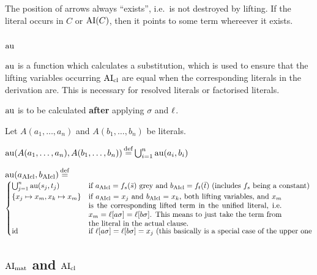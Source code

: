 \documentclass[,%
	paper=a4,%
	DIV12, %
	twoside=false,%
	liststotoc,
	bibtotoc,
	draft=false,%
	numbers=noendperiod
]{scrartcl}
\begin{document}
\begin{conj}
	The position of arrows always ``exists'', i.e.~is not destroyed by lifting. If the literal occurs in $C$ or $\operatorname{AI}(C)$, then it points to some term whereever it exists.
\end{conj}

\subsection{$\operatorname{au}$}

$\operatorname{au}$ is a function which calculates a substitution, which is used to ensure that the lifting variables occurring $\operatorname{AI}_\mathrm{cl}$ are equal when the corresponding literals in the derivation are. This is necessary for resolved literals or factorised literals.

$\operatorname{au}$ is to be calculated \textbf{after} applying $\sigma$ and $\ell$.

Let $A(a_1, \dotsc, a_n)$ and $A(b_1, \dotsc, b_n)$ be literals.

$\operatorname{au}(A(a_1, \dotsc, a_n), A(b_1, \dotsc, b_n)) \operatorname{\stackrel{\mathrm{def}}{=}} \bigcup_{i=1}^n \operatorname{au}(a_i, b_i)$

$ \aiu (a\fromclause, b\fromclause) \defeq $\newline $
\begin{cases}
	\bigcup_{j=1}^n \aiu(s_j, t_j) & \text{if $a\cl=f_s(\bar s)$ grey and $b\cl = f_t(\bar t)$ (includes $f_s$ being a constant)} \\
\{x_j \mapsto x_m, x_k \mapsto x_m\} & \parbox[t]{.75\textwidth}{if $a\cl = x_j$ and $b\cl = x_k$, both lifting variables, and $x_m$ is the corresponding lifted term in the unified literal, i.e. $x_m = \lifboth{a\sigma} = \lifboth{b\sigma}$. This means to just take the term from the literal in the actual clause.
	{\tiny


}}\\
\id & \text{if $\lifboth{a\sigma} = \lifboth{b\sigma} = x_j$ (this basically is a special case of the upper one}
\end{cases} $


\subsection{$\operatorname{AI}_\mathrm{mat}$ and $\operatorname{AI}_\mathrm{cl}$}
\end{document}
